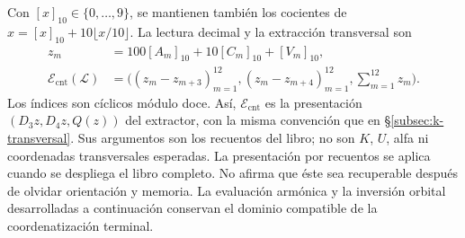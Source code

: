 Con \([x]_{10}\in\{0,\ldots,9\}\), se mantienen también los cocientes
de \(x=[x]_{10}+10\lfloor x/10\rfloor\). La lectura decimal y la
extracción transversal son
\[
\begin{aligned}
 z_m&=100[A_m]_{10}+10[C_m]_{10}+[V_m]_{10},\\
 \mathcal E_{\mathrm{cnt}}(\mathscr L)
   &=\bigl((z_m-z_{m+3})_{m=1}^{12},
           (z_m-z_{m+4})_{m=1}^{12},\sum_{m=1}^{12}z_m\bigr).
\end{aligned}
\]
Los índices son cíclicos módulo doce. Así, \(\mathcal E_{\mathrm{cnt}}\)
es la presentación \((D_3z,D_4z,Q(z))\) del extractor, con la misma
convención que en \S\ref{subsec:k-transversal}. Sus argumentos son los
recuentos del libro; no son \(K\), \(U\), alfa ni coordenadas transversales
esperadas. La presentación por recuentos se aplica cuando se despliega
el libro completo. No afirma que éste sea recuperable después de olvidar
orientación y memoria. La evaluación armónica y la inversión orbital
desarrolladas a continuación conservan el dominio compatible de la
coordenatización terminal.
